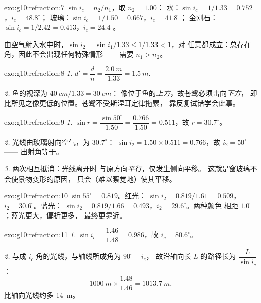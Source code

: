 \begin{solution}{exo:g10:refraction:7}
$\sin i_c = n_2/n_1$，取 $n_2 = 1.00$：
水：$\sin i_c = 1/1.33 = 0.752$，$i_c = 48.8^\circ$；
玻璃：$\sin i_c = 1/1.50 = 0.667$，$i_c = 41.8^\circ$；
金刚石：$\sin i_c = 1/2.42 = 0.413$，$i_c = 24.4^\circ$。

由空气射入水中时，$\sin i_2 = \sin i_1/1.33 \leq 1/1.33 < 1$，对
任意都成立：总存在角，因此不会出现任何特殊情形——
需要 $n_1 > n_2$。
\end{solution}

\begin{solution}{exo:g10:refraction:8}
\emph{1.} $d' = \dfrac{d}{n} = \dfrac{\qty{2.0}{m}}{1.33}
= \qty{1.5}{m}$.

\emph{2.} 鱼的视深为 $\qty{40}{cm}/1.33 = \qty{30}{cm}$：
像位于鱼的\emph{上方}，故苍鹭必须击向\emph{下方}，
即比所见之像更低的位置。苍鹭不受斯涅耳定律拖累，
靠反复试错学会此事。
\end{solution}

\begin{solution}{exo:g10:refraction:9}
\emph{1.} $\sin r = \dfrac{\sin 50^\circ}{1.50} = \dfrac{0.766}{1.50}
= 0.511$，故 $r = 30.7^\circ$。

\emph{2.} 光线由玻璃射向空气，为 $30.7^\circ$：
$\sin i_2 = 1.50 \times 0.511 = 0.766$，故 $i_2 = 50^\circ$——
出射角等于。

\emph{3.} 两次相互抵消：光线离开时
与原方向\emph{平行}，仅发生侧向平移。
这就是窗玻璃不会使景物变形的原因，
只会（难以察觉地）使其平移。
\end{solution}

\begin{solution}{exo:g10:refraction:10}
$\sin 55^\circ = 0.819$。红光：
$\sin i_2 = 0.819/1.61 = 0.509$，$i_2 = 30.6^\circ$。蓝光：
$\sin i_2 = 0.819/1.66 = 0.493$，$i_2 = 29.6^\circ$。两种颜色
相距 $1.0^\circ$；蓝光更大，偏折更多，
最终更靠近。
\end{solution}

\begin{solution}{exo:g10:refraction:11}
\emph{1.} $\sin i_c = \dfrac{1.46}{1.48} = 0.986$，故
$i_c = 80.6^\circ$。

\emph{2.} 与成 $i_c$ 角的光线，与轴线所成角为 $90^\circ - i_c$，
故沿轴向长 $L$ 的路径长为 $\dfrac{L}{\sin i_c}$：
\[
\qty{1000}{m} \times \frac{1.48}{1.46} = \qty{1013.7}{m},
\]
比轴向光线约多 \qty{14}{m}。
\end{solution}

